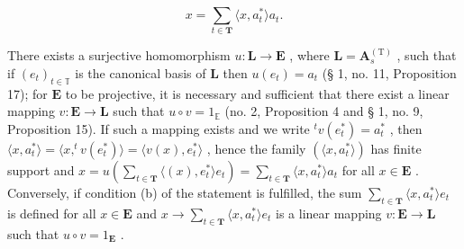 \[
x = \sum_ {t \in \mathbf {T}} \langle x, a _ {t} ^ {*} \rangle a _ {t}.\tag{26}
\]

There exists a surjective homomorphism \(u: \mathbf{L} \to \mathbf{E}\) , where \(\mathbf{L} = \mathbf{A}_s^{(\mathrm{T})}\) , such that if \((e_t)_{t \in \mathbb{T}}\) is the canonical basis of \(\mathbf{L}\) then \(u(e_t) = a_t\) (§ 1, no. 11, Proposition 17); for \(\mathbf{E}\) to be projective, it is necessary and sufficient that there exist a linear mapping \(v: \mathbf{E} \to \mathbf{L}\) such that \(u \circ v = 1_{\mathbb{E}}\) (no. 2, Proposition 4 and § 1, no. 9, Proposition 15). If such a mapping exists and we write \(^tv(e_t^*) = a_t^*\) , then \(\langle x, a_t^* \rangle = \langle x, ^tv(e_t^*) \rangle = \langle v(x), e_t^* \rangle\) , hence the family \((\langle x, a_t^* \rangle)\) has finite support and \(x = u\left(\sum_{t \in \mathbf{T}} \langle (x), e_t^* \rangle e_t\right) = \sum_{t \in \mathbf{T}} \langle x, a_t^* \rangle a_t\) for all \(x \in \mathbf{E}\) . Conversely, if condition (b) of the statement is fulfilled, the sum \(\sum_{t \in \mathbf{T}} \langle x, a_t^* \rangle e_t\) is defined for all \(x \in \mathbf{E}\) and \(x \to \sum_{t \in \mathbf{T}} \langle x, a_t^* \rangle e_t\) is a linear mapping \(v: \mathbf{E} \to \mathbf{L}\) such that \(u \circ v = 1_{\mathbf{E}}\) .

